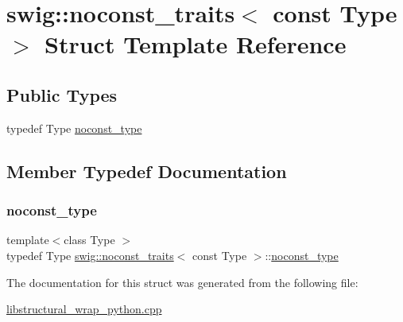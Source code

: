 \hypertarget{structswig_1_1noconst__traits_3_01const_01_type_01_4}{}\section{swig\+:\+:noconst\+\_\+traits$<$ const Type $>$ Struct Template Reference}
\label{structswig_1_1noconst__traits_3_01const_01_type_01_4}
\subsection*{Public Types}
\begin{DoxyCompactItemize}
\item 
typedef Type \hyperlink{structswig_1_1noconst__traits_3_01const_01_type_01_4_a47a8b24d65b72185304a9e51211f721f}{noconst\+\_\+type}
\end{DoxyCompactItemize}


\subsection{Member Typedef Documentation}
\mbox{\label{structswig_1_1noconst__traits_3_01const_01_type_01_4_a47a8b24d65b72185304a9e51211f721f}} 
\subsubsection{\texorpdfstring{noconst\+\_\+type}{noconst\_type}}
{\footnotesize\ttfamily template$<$class Type $>$ \\
typedef Type \hyperlink{structswig_1_1noconst__traits}{swig\+::noconst\+\_\+traits}$<$ const Type $>$\+::\hyperlink{structswig_1_1noconst__traits_3_01const_01_type_01_4_a47a8b24d65b72185304a9e51211f721f}{noconst\+\_\+type}}



The documentation for this struct was generated from the following file\+:\begin{DoxyCompactItemize}
\item 
\hyperlink{libstructural__wrap__python_8cpp}{libstructural\+\_\+wrap\+\_\+python.\+cpp}\end{DoxyCompactItemize}
